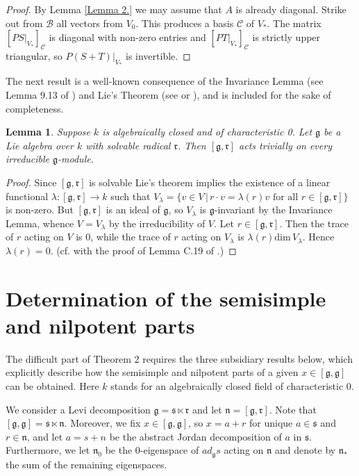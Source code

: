 \documentclass{amsart}
\newtheorem{lemma}[theorem]{Lemma}
\theoremstyle{definition}
\theoremstyle{remark}
\numberwithin{equation}{section}
\newcommand \g{{\mathfrak g}}
\newcommand  \s{{\mathfrak s}}
\renewcommand \r{{\mathfrak r}}
\def \n{{\mathfrak n}}
\newcommand \D{{\mathcal C}}
\newcommand \B{{\mathcal B}}
\begin{document}
\begin{proof}
 By Lemma \ref{Lemma 2.} we may assume that $A$ is already diagonal.
Strike out from $\B$ all vectors from $V_0$.
This produces a basis $\D$ of $V_*$.
The matrix $[PS\vert_{V_*}]_\D$ is diagonal with non-zero
entries and $[PT\vert_{V_*}]_\D$ is strictly upper triangular,
so $P(S+T)\vert_{V_*}$ is invertible.
\end{proof}


The next result is a well-known consequence of the Invariance Lemma
(see Lemma 9.13 of \cite{FH}) and Lie's Theorem (see \cite{FH} or \cite{Hu}),
and is included for the sake of completeness.



\medskip

\begin{lemma}\label{Lemma 4.}
 Suppose $k$ is algebraically closed and of characteristic 0. Let $\g$ be a Lie algebra over $k$ with solvable radical $\r$. Then  $[\g,\r]$ acts trivially on every irreducible $\g$-module.
\end{lemma}

\begin{proof}
  Since $[\g,\r]$ is solvable Lie's theorem implies the existence of a linear functional
$\lambda: [\g,\r]\to k$ such that $V_\lambda=\{v\in V\,\vert\, r\cdot v=\lambda(r)v\text{ for all }r\in [\g,\r]\}$
is non-zero. But $[\g,\r]$ is an ideal of $\g$, so $V_\lambda$ is $\g$-invariant by the Invariance Lemma,
whence $V=V_\lambda$ by the irreducibility of $V$. Let $r\in [\g,\r]$.
Then the trace of $r$ acting on $V$ is 0, while the trace of $r$ acting on $V_\lambda$ is
$\lambda(r)\mathrm{dim}\,V_\lambda$. Hence $\lambda(r)=0$.
(cf. with the proof of Lemma C.19 of \cite{FH}.)
\end{proof}



\section{Determination of the semisimple and nilpotent parts}
The difficult part of Theorem 2 requires the three subsidiary results below, which
explicitly describe how the semisimple and nilpotent parts of a given $x\in[\g,\g]$
can be obtained. Here $k$ stands for an algebraically closed field of characteristic 0.

We consider a Levi decomposition
$\g=\s\ltimes \r$ and let $\n=[\g,\r]$. Note that $[\g,\g]=\s\ltimes \n$.
Moreover, we fix $x\in[\g,\g]$, so $x=a+r$ for unique $a\in\s$ and $r\in \n$,
and let $a=s+n$ be the abstract Jordan decomposition of $a$ in $\s$.
Furthermore, we let $\n_0$ be the 0-eigenspace of $ad_{\g} s$ acting on
$\n$ and denote by $\n_*$ the sum of the remaining eigenspaces.
\end{document}
